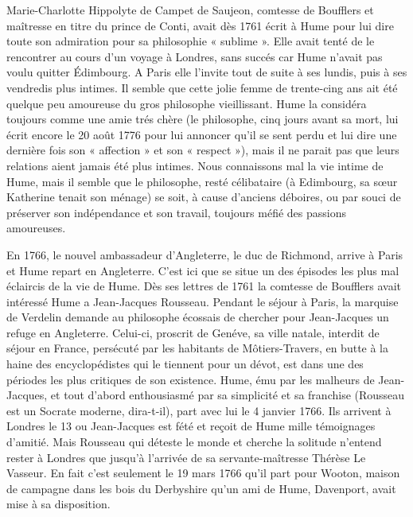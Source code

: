 Marie-Charlotte Hippolyte de Campet de Saujeon,
comtesse de Boufflers et maîtresse en titre du prince
de Conti, avait dès 1761 écrit à Hume pour lui dire
toute son admiration pour sa philosophie « sublime ».
Elle avait tenté de le rencontrer au cours d’un voyage
à Londres, sans succés car Hume n’avait pas voulu
quitter Édimbourg. A Paris elle l'invite tout de
suite à ses lundis, puis à ses vendredis plus intimes.
Il semble que cette jolie femme de trente-cing ans
ait été quelque peu amoureuse du gros philosophe
vieillissant. Hume la considéra toujours comme une
amie trés chère (le philosophe, cinq jours avant sa
mort, lui écrit encore le 20 août 1776 pour lui
annoncer qu’il se sent perdu et lui dire une dernière
fois son « affection » et son « respect »), mais il ne
parait pas que leurs relations aient jamais été plus
intimes. Nous connaissons mal la vie intime de Hume,
mais il semble que le philosophe, resté célibataire
(à Edimbourg, sa s{\oe}ur Katherine tenait son ménage)
se soit, à cause d’anciens déboires, ou par souci de
préserver son indépendance et son travail, toujours
méfié des passions amoureuses.

En 1766, le nouvel ambassadeur d’Angleterre, le
duc de Richmond, arrive à Paris et Hume repart
en Angleterre. C’est ici que se situe un des épisodes
les plus mal éclaircis de la vie de Hume. Dès ses
lettres de 1761 la comtesse de Boufflers avait intéressé
Hume a Jean-Jacques Rousseau. Pendant le
séjour à Paris, la marquise de Verdelin demande au
philosophe écossais de chercher pour Jean-Jacques
un refuge en Angleterre. Celui-ci, proscrit de Genéve,
sa ville natale, interdit de séjour en France, persécuté
par les habitants de Môtiers-Travers, en butte à la
haine des encyclopédistes qui le tiennent pour un
dévot, est dans une des périodes les plus critiques de
son existence. Hume, ému par les malheurs de
Jean-Jacques, et tout d’abord enthousiasmé par sa
simplicité et sa franchise (Rousseau est un Socrate
moderne, dira-t-il), part avec lui le 4 janvier 1766.
Ils arrivent à Londres le 13 ou Jean-Jacques est
fété et reçoit de Hume mille témoignages d’amitié.
Mais Rousseau qui déteste le monde et cherche la
solitude n’entend rester à Londres que jusqu’à
l'arrivée de sa servante-maîtresse Thérèse Le Vasseur.
En fait c’est seulement le 19 mars 1766 qu’il part
pour Wooton, maison de campagne dans les bois du
Derbyshire qu’un ami de Hume, Davenport, avait
mise à sa disposition.

